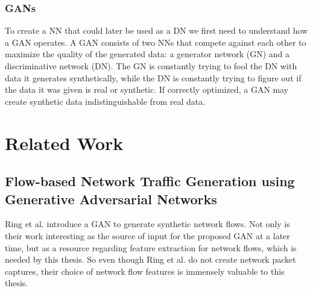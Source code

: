 \documentclass[
	ngerman,
	ruledheaders=section,%
	class=report,%
	thesis={type=bachelor},%
	accentcolor=9c,%
	custommargins=true,%
	marginpar=false,%
	parskip=half-,%
	fontsize=11pt,%
]{tudapub}
\begin{document}


\subsection{GANs}

To create a NN that could later be used as a DN we first need to understand how a GAN operates.
A GAN consists of two NNs that compete against each other to maximize the quality of the generated data:
a generator network (GN) and a discriminative network (DN).
The GN is constantly trying to fool the DN with data it generates synthetically,
while the DN is constantly trying to figure out if the data it was given is real or synthetic.
If correctly optimized, a GAN may create synthetic data indistinguishable from real data.

\chapter{Related Work}

\section{Flow-based Network Traffic Generation using Generative Adversarial Networks}

Ring et al. \cite{ringFlowbasedNetworkTraffic2019a} introduce a GAN to generate synthetic network flows.
Not only is their work interesting as the source of input for the proposed GAN at a later time,
but as a resource regarding feature extraction for network flows,
which is needed by this thesis.
So even though Ring et al. \cite{ringFlowbasedNetworkTraffic2019a} do not create network packet captures,
their choice of network flow features is immensely valuable to this thesis.
\end{document}
